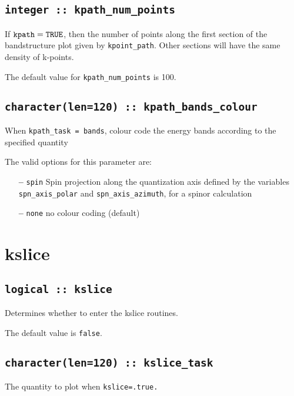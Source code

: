 \subsection[kpath\_num\_points]{\tt integer :: kpath\_num\_points}

If $\verb#kpath#=\verb#TRUE#$, then the number of points along
the first section of the bandstructure plot given by
\verb#kpoint_path#. Other sections will have the same density of
k-points. 

The default value for \verb#kpath_num_points# is 100.


\subsection[kpath\_colour]{\tt character(len=120) ::
  kpath\_bands\_colour}
When {\tt kpath\_task = bands}, colour code the energy bands according
to the specified quantity

The valid options for this parameter are:
\begin{itemize}
\item[{\bf --}]  \verb#spin# Spin projection along the quantization axis
defined by the variables {\tt spn\_axis\_polar} and {\tt spn\_axis\_azimuth},
for a spinor calculation
\item[{\bf --}]  \verb#none# no colour coding (default)
\end{itemize}



\clearpage
\section{kslice}

\subsection[berry]{\tt logical :: kslice}
Determines whether to enter the kslice routines.

The default value is \verb#false#.

\subsection[kslice\_task]{\tt character(len=120) ::  kslice\_task}
The quantity to plot when {\tt kslice=.true.} 

